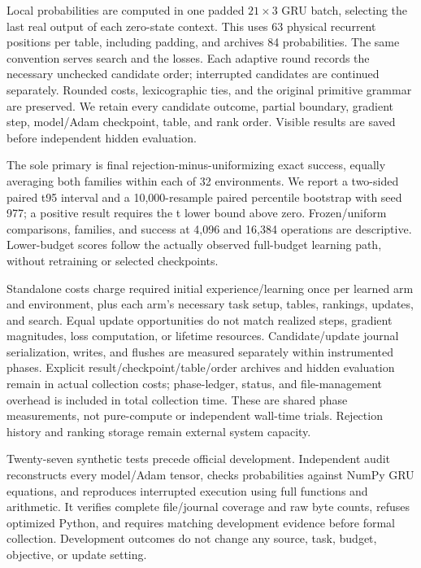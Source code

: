 \documentclass[11pt]{article}
\begin{document}
Local probabilities are computed in one padded $21\times3$ GRU batch,
selecting the last real output of each zero-state context. This uses 63
physical recurrent positions per table, including padding, and archives 84
probabilities. The same convention serves search and the losses. Each
adaptive round records the necessary unchecked candidate order; interrupted
candidates are continued separately. Rounded costs, lexicographic ties, and
the original primitive grammar are preserved. We retain every candidate
outcome, partial boundary, gradient step, model/Adam checkpoint, table, and
rank order. Visible results are saved before independent hidden evaluation.

The sole primary is final rejection-minus-uniformizing exact success,
equally averaging both families within each of 32 environments. We report a
two-sided paired t95 interval and a 10,000-resample paired percentile bootstrap
with seed 977; a positive result requires the t lower bound above zero.
Frozen/uniform comparisons, families, and success at 4,096 and 16,384
operations are descriptive. Lower-budget scores follow the actually observed
full-budget learning path, without retraining or selected checkpoints.

Standalone costs charge required initial experience/learning once per learned
arm and environment, plus each arm's necessary task setup, tables, rankings,
updates, and search. Equal update opportunities do not match realized steps,
gradient magnitudes, loss computation, or lifetime resources. Candidate/update
journal serialization, writes, and flushes are measured separately within
instrumented phases. Explicit result/checkpoint/table/order archives and
hidden evaluation remain in actual collection costs; phase-ledger, status,
and file-management overhead is included in total collection time. These are
shared phase measurements, not pure-compute or independent wall-time trials.
Rejection history and ranking storage remain external system capacity.

Twenty-seven synthetic tests precede official development. Independent audit
reconstructs every model/Adam tensor, checks probabilities against NumPy GRU
equations, and reproduces interrupted execution using full functions and
arithmetic. It verifies complete file/journal coverage and raw byte counts,
refuses optimized Python, and requires matching development evidence before
formal collection. Development outcomes do not change any source, task,
budget, objective, or update setting.

\newpage
\end{document}
